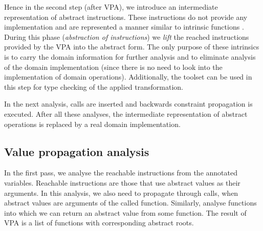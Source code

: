 Hence in the second step (after VPA), we introduce an intermediate representation of
abstract instructions. These instructions do not provide any implementation and
are represented a manner similar to \LLVM intrinsic functions
\cite{LLVM:langref}. During this phase (\emph{abstraction of instructions}) we
\emph{lift} the reached instructions provided by the VPA into the abstract form. The
only purpose of these intrinsics is to carry the domain information for further
analysis and to eliminate analysis of the domain implementation (since there is no need
to look into the implementation of domain operations). Additionally, the \LLVM
toolset can be used in this step for type checking of the applied transformation.

In the next analysis,  calls are inserted and backwards constraint
propagation is executed. After all these analyses, the intermediate
representation of abstract operations is replaced by a real domain
implementation.

\subsection{Value propagation analysis}
In the first \LLVM pass, we analyse the reachable instructions from the
annotated variables. Reachable instructions are those that use abstract values
as their arguments. In this analysis, we also need to propagate through calls,
when abstract values are arguments of the called function. Similarly, analyse functions into which we can return an abstract value from some function. The
result of VPA is a list of functions with corresponding abstract roots.

